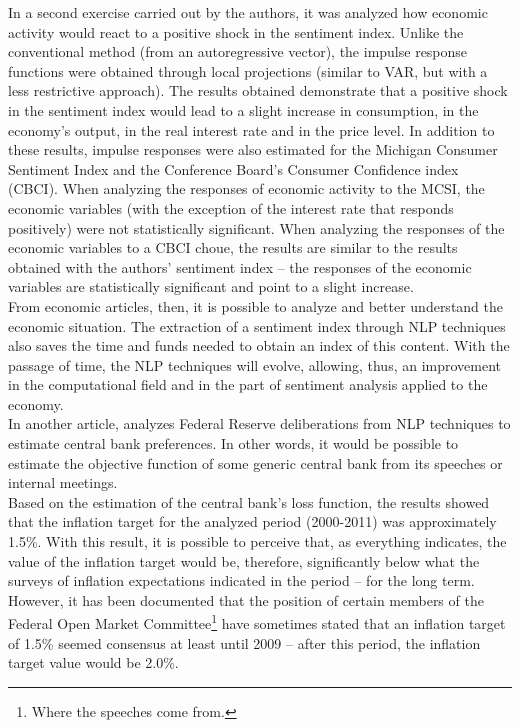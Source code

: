 In a second exercise carried out by the authors, it was analyzed how economic activity would react to a positive shock in the sentiment index. Unlike the conventional method (from an autoregressive vector), the impulse response functions were obtained through local projections \cite{jorda2005estimation} (similar to VAR, but with a less restrictive approach). The results obtained demonstrate that a positive shock in the sentiment index would lead to a slight increase in consumption, in the economy's output, in the real interest rate and in the price level. In addition to these results, impulse responses were also estimated for the Michigan Consumer Sentiment Index and the Conference Board's Consumer Confidence index (CBCI). When analyzing the responses of economic activity to the MCSI, the economic variables (with the exception of the interest rate that responds positively) were not statistically significant. When analyzing the responses of the economic variables to a CBCI choue, the results are similar to the results obtained with the authors' sentiment index -- the responses of the economic variables are statistically significant and point to a slight increase.\\

From economic articles, then, it is possible to analyze and better understand the economic situation. The extraction of a sentiment index through NLP techniques also saves the time and funds needed to obtain an index of this content. With the passage of time, the NLP techniques will evolve, allowing, thus, an improvement in the computational field and in the part of sentiment analysis applied to the economy.\\

In another article, \cite{shapiro2021taking} analyzes Federal Reserve deliberations from NLP techniques to estimate central bank preferences. In other words, it would be possible to estimate the objective function of some generic central bank from its speeches or internal meetings.\\

Based on the estimation of the central bank's loss function, the results showed that the inflation target for the analyzed period (2000-2011) was approximately 1.5\%. With this result, it is possible to perceive that, as everything indicates, the value of the inflation target would be, therefore, significantly below what the surveys of inflation expectations indicated in the period -- for the long term. However, it has been documented \cite[p.32]{shapiro2021taking} that the position of certain members of the Federal Open Market Committee\footnote{Where the speeches come from.} have sometimes stated that an inflation target of 1.5\% seemed consensus at least until 2009 -- after this period, the inflation target value would be 2.0\%.\\

